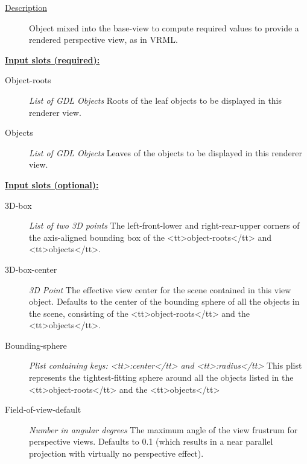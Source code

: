 \documentclass [11pt]{book}
\begin{document}
\begin{itemize}
\begin{description}
\item [
\underline{Description}]


Object mixed into the base-view to compute required values to provide
a rendered perspective view, as in VRML.



\end{description}








\textbf{
\underline{Input slots (required):}}

\begin{description}

\item [Object-roots]
\emph{List of GDL Objects} Roots of the leaf objects to be displayed in this renderer view.


\item [Objects]
\emph{List of GDL Objects} Leaves of the objects to be displayed in this renderer view.


\end{description}






\textbf{
\underline{Input slots (optional):}}

\begin{description}

\item [3D-box]
\emph{List of two 3D points} The left-front-lower and right-rear-upper corners of the axis-aligned bounding
box of the <tt>object-roots</tt> and <tt>objects</tt>.


\item [3D-box-center]
\emph{3D Point} The effective view center for the scene contained in this view object. Defaults to the center of the bounding sphere of all
the objects in the scene, consisting of the <tt>object-roots</tt> and the <tt>objects</tt>.


\item [Bounding-sphere]
\emph{Plist containing keys: <tt>:center</tt> and <tt>:radius</tt>} This plist represents the tightest-fitting sphere
around all the objects listed in the <tt>object-roots</tt> and the <tt>objects</tt>


\item [Field-of-view-default]
\emph{Number in angular degrees} The maximum angle of the view frustrum for perspective views.
Defaults to 0.1 (which results in a near parallel projection with virtually no perspective effect).



\end{description}
\end{itemize}
\end{document}
